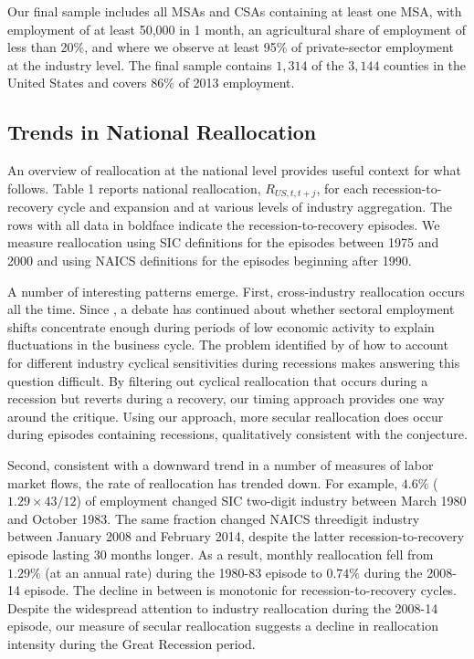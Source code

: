 \documentclass[12pt]{article}
\theoremstyle{definition}
\begin{document}
Our final sample includes all MSAs and CSAs containing at least one MSA, with employment of at least 50,000 in 1 month, an agricultural share of employment of less than 20\%, and where we observe at least 95\% of private-sector employment at the industry level. The final sample contains $1,314$ of the $3,144$ counties in the United States and covers $86\%$ of 2013 employment.

\subsection{Trends in National Reallocation}

An overview of reallocation at the national level provides useful context for what follows. Table 1 reports national reallocation, $R_{US, t, t+j}$, for each recession-to-recovery cycle and expansion and at various levels of industry aggregation. The rows with all data in boldface indicate the recession-to-recovery episodes. We measure reallocation using SIC definitions for the episodes between 1975 and 2000 and using NAICS definitions for the episodes beginning after 1990.

A number of interesting patterns emerge. First, cross-industry reallocation occurs all the time. Since \citet{lilienSectoralShiftsCyclical1982}, a debate has continued about whether sectoral employment shifts concentrate enough during periods of low economic activity to explain fluctuations in the business cycle. The problem identified by \cite{abrahamCyclicalUnemploymentSectoral1986} of how to account for different industry cyclical sensitivities during recessions makes answering this question difficult. By filtering out cyclical reallocation that occurs during a recession but reverts during a recovery, our timing approach provides one way around the \citet{abrahamCyclicalUnemploymentSectoral1986} critique. Using our approach, more secular reallocation does occur during episodes containing recessions, qualitatively consistent with the \citeauthor{lilienSectoralShiftsCyclical1982} conjecture.

Second, consistent with a downward trend in a number of measures of labor market flows, the rate of reallocation has trended down. For example, $4.6\%$ ($1.29 \times 43/12$) of employment changed SIC two-digit industry between March 1980 and October 1983. The same fraction changed NAICS threedigit industry between January 2008 and February 2014, despite the latter recession-to-recovery episode lasting $30$ months longer. As a result, monthly reallocation fell from $1.29\%$ (at an annual rate) during the 1980-83 episode to $0.74\%$ during the 2008-14 episode. The decline in between is monotonic for recession-to-recovery cycles. Despite the widespread attention to industry reallocation during the 2008-14 episode, our measure of secular reallocation suggests a decline in reallocation intensity during the Great Recession period.
\end{document}
